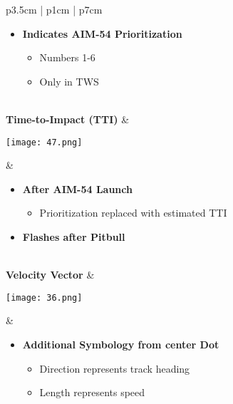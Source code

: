 \documentclass[8pt,usenames,dvipsnames,twoside]{article}
\begin{document}
\begin{center}
\begin{longtable}{p{3.5cm} | p{1cm} | p{7cm}}
				\begin{minipage}[t]{\linewidth}
					\vspace{-7pt}
					\begin{itemize}
						\item \textbf{Indicates AIM-54 Prioritization}
						\begin{itemize}
							\item Numbers 1-6
							\item Only in TWS
						\end{itemize}
					\end{itemize}
				\end{minipage} \\
				\midrule
				\textbf{Time-to-Impact (TTI)} &
				\begin{minipage}[t]{\linewidth}
					\vspace{-7pt}
					\centering
					\texttt{[image: 47.png]}
				\end{minipage} &  
				\begin{minipage}[t]{\linewidth}
					\vspace{-7pt}
					\begin{itemize}
						\item \textbf{After AIM-54 Launch}
						\begin{itemize}
							\item Prioritization replaced with estimated TTI
						\end{itemize}
						\item \textbf{Flashes after Pitbull}
					\end{itemize}
				\end{minipage} \\
				\midrule
				\textbf{Velocity Vector} &
				\begin{minipage}[t]{\linewidth}
					\vspace{-7pt}
					\centering
					\texttt{[image: 36.png]}
				\end{minipage} &  
				\begin{minipage}[t]{\linewidth}
					\vspace{-7pt}
					\begin{itemize}
						\item \textbf{Additional Symbology from center Dot}
						\begin{itemize}
							\item Direction represents track heading
							\item Length represents speed
						\end{itemize}

\end{itemize}
\end{minipage}
\end{longtable}
\end{center}
\end{document}
